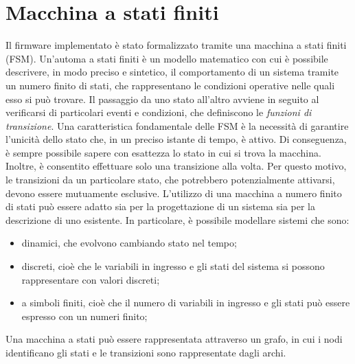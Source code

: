 \section{Macchina a stati finiti} \label{cap:FSM}
Il firmware implementato è stato formalizzato tramite una macchina a stati finiti (FSM). Un'automa a stati finiti è un modello matematico con cui è possibile descrivere, in modo preciso e sintetico, il comportamento di un sistema tramite un numero finito di stati, che rappresentano le condizioni operative nelle quali esso si può trovare. Il passaggio da uno stato all'altro avviene in seguito al verificarsi di particolari eventi e condizioni, che definiscono le \textit{funzioni di transizione}. Una caratteristica fondamentale delle FSM è la necessità di garantire l'unicità dello stato che, in un preciso istante di tempo, è attivo. Di conseguenza, è sempre possibile sapere con esattezza lo stato in cui si trova la macchina. Inoltre, è consentito effettuare solo una transizione alla volta. Per questo motivo, le transizioni da un particolare stato, che potrebbero potenzialmente attivarsi, devono essere mutuamente esclusive.
L'utilizzo di una macchina a numero finito di stati può essere adatto sia per la progettazione di un sistema sia per la descrizione di uno esistente. In particolare, è possibile modellare sistemi che sono:
\begin{itemize}
	\item dinamici, che evolvono cambiando stato nel tempo;
	\item discreti, cioè che le variabili in ingresso e gli stati del sistema si possono rappresentare con valori discreti;
	\item a simboli finiti, cioè che il numero di variabili in ingresso e gli stati può essere espresso con un numeri finito;
\end{itemize}
Una macchina a stati può essere rappresentata attraverso un grafo, in cui i nodi identificano gli stati e le transizioni sono rappresentate dagli archi.

